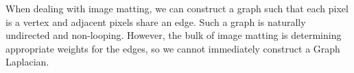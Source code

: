 When dealing with image matting, we can construct a graph such that each pixel is a vertex and adjacent pixels share an edge. Such a graph is naturally undirected and non-looping. However, the bulk of image matting is determining appropriate weights for the edges, so we cannot immediately construct a Graph Laplacian.